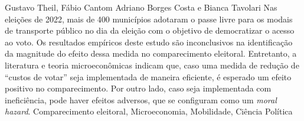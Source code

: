 \documentclass[
    10pt, 
    a4paper, 
    ]{article}
\begin{document}
\tableofcontents

    {Gustavo Theil, Fábio Cantom}
    {Adriano Borges Costa e Bianca Tavolari}
    {
        Nas eleições de 2022, mais de 400 municípios adotaram o passe livre para os modais de transporte público no dia da eleição com o objetivo de democratizar o acesso ao voto. Os resultados empíricos deste estudo são inconclusivos na identificação da magnitude do efeito dessa medida no comparecimento eleitoral. Entretanto, a literatura e teoria microeconômicas indicam que, caso uma medida de redução de ``custos de votar'' seja implementada de maneira eficiente, é esperado um efeito positivo no comparecimento. Por outro lado, caso seja implementada com ineficiência, pode haver efeitos adversos, que se configuram como um \textit{moral hazard}.
    }
    {Comparecimento eleitoral, Microeconomia, Mobilidade, Ciência Política}





% 



% 

\printbibliography

\appendix
\end{document}
